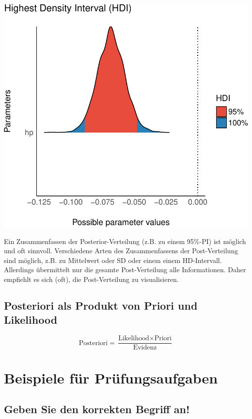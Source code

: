 \documentclass[
  a4paper,
  DIV=11]{scrreprt}
\theoremstyle{definition}
\theoremstyle{remark}
\begin{document}
\includegraphics{./abschluss_files/figure-pdf/unnamed-chunk-7-1.pdf}

Ein Zusammenfassen der Posterior-Verteilung (z.B. zu einem 95\%-PI) ist
möglich und oft sinnvoll. Verschiedene Arten des Zusammenfassens der
Post-Verteilung sind möglich, z.B. zu Mittelwert oder SD oder einem
einem HD-Intervall. Allerdings übermittelt nur die gesamte
Post-Verteilung alle Informationen. Daher empfiehlt es sich (oft), die
Post-Verteilung zu visualisieren.

\hypertarget{posteriori-als-produkt-von-priori-und-likelihood-1}{%
\subsection{Posteriori als Produkt von Priori und
Likelihood}\label{posteriori-als-produkt-von-priori-und-likelihood-1}}

\[\text{Posteriori} = \frac{\text{Likelihood} \times \text{Priori}}{\text{Evidenz}}\]

\hypertarget{beispiele-fuxfcr-pruxfcfungsaufgaben}{%
\section{Beispiele für
Prüfungsaufgaben}\label{beispiele-fuxfcr-pruxfcfungsaufgaben}}

\hypertarget{geben-sie-den-korrekten-begriff-an}{%
\subsection{Geben Sie den korrekten Begriff
an!}\label{geben-sie-den-korrekten-begriff-an}}
\end{document}
